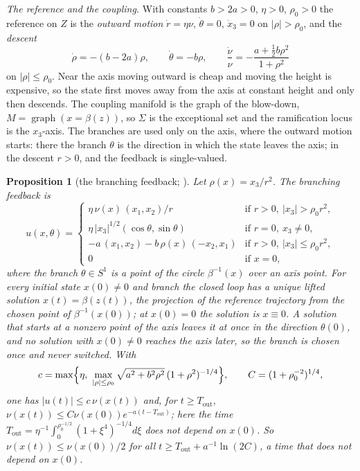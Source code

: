 \documentclass[11pt,reqno]{amsart}
\theoremstyle{plain}
\newtheorem*{proposition}{Proposition}
\theoremstyle{remark}
\theoremstyle{definition}
\DeclareMathOperator{\graph}{graph}
\newcommand{\Sig}{\Sigma}
\begin{document}
\emph{The reference and the coupling.} With constants $b>2a>0$, $\eta>0$, $\rho_0>0$ the reference on $Z$ is the
\emph{outward motion} $\dot r=\eta\nu$, $\dot\theta=0$, $\dot x_3=0$ on $|\rho|>\rho_0$, and the \emph{descent}
\[
  \dot\rho=-(b-2a)\rho,\qquad \dot\theta=-b\rho,\qquad \frac{\dot\nu}{\nu}=-\frac{a+\frac12 b\rho^{2}}{1+\rho^{2}}
\]
on $|\rho|\le\rho_0$. Near the axis moving outward is cheap and moving the height is expensive, so the state first
moves away from the axis at constant height and only then descends. The coupling manifold is the graph of the
blow-down, $M=\graph(x=\beta(z))$, so $\Sig$ is the exceptional set and the ramification locus is the $x_3$-axis. The branches are used only on
the axis, where the outward motion starts: there the branch $\theta$ is the direction in which the state leaves
the axis; in the descent $r>0$, and the feedback is single-valued.

\begin{proposition}[the branching feedback; {\cite[\S4.2]{Companion}}]
Let $\rho(x)=x_3/r^{2}$. The branching feedback is
\[
  u(x,\theta)=\begin{cases}
    \eta\,\nu(x)\,(x_1,x_2)/r & \text{if } r>0,\ |x_3|>\rho_0r^{2},\\[0.5ex]
    \eta\,|x_3|^{1/2}(\cos\theta,\sin\theta) & \text{if } r=0,\ x_3\neq0,\\[0.5ex]
    -a\,(x_1,x_2)-b\,\rho(x)\,(-x_2,x_1) & \text{if } r>0,\ |x_3|\le\rho_0r^{2},\\[0.5ex]
    0 & \text{if } x=0,
  \end{cases}
\]
where the branch $\theta\in S^{1}$ is a point of the circle $\beta^{-1}(x)$ over an axis point. For every initial state $x(0)\ne0$ and branch the closed loop has a unique lifted solution $x(t)=\beta(z(t))$, the projection of the
reference trajectory from the chosen point of $\beta^{-1}(x(0))$; at $x(0)=0$ the solution is $x\equiv0$. A solution that starts at a nonzero point of the axis leaves it at once in the direction $\theta(0)$, and no solution with $x(0)\ne0$ reaches the axis later, so the branch is chosen
once and never switched. With
\[
  c=\max\Bigl\{\eta,\ \max_{|\rho|\le\rho_0}\sqrt{a^{2}+b^{2}\rho^{2}}\,(1+\rho^{2})^{-1/4}\Bigr\},\qquad
  C=(1+\rho_0^{-2})^{1/4},
\]
one has $|u(t)|\le c\,\nu(x(t))$ and, for $t\ge T_{\mathrm{out}}$,
$\nu(x(t))\le C\nu(x(0))e^{-a(t-T_{\mathrm{out}})}$; here the time
$T_{\mathrm{out}}=\eta^{-1}\int_0^{\rho_0^{-1/2}}(1+\xi^{4})^{-1/4}d\xi$ does not depend on $x(0)$. So
$\nu(x(t))\le\nu(x(0))/2$ for all $t\ge T_{\mathrm{out}}+a^{-1}\ln(2C)$, a time that does not depend on $x(0)$.
\end{proposition}
\end{document}
